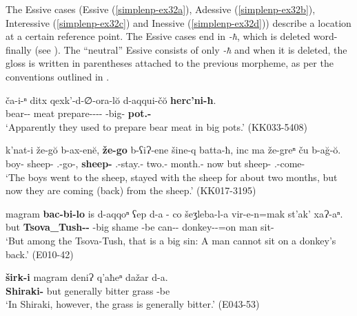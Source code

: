 The Essive cases (Essive (\ref{simplenp-ex32a}), Adessive (\ref{simplenp-ex32b}), Interessive (\ref{simplenp-ex32c}) and Inessive (\ref{simplenp-ex32d})) describe a location at a certain reference point. The Essive cases end in \textit{-ħ}, which is deleted word-finally (see ). The ``neutral'' Essive consists of only  \textit{-ħ} and when it is deleted, the gloss {\Ess} is written in parentheses attached to the previous morpheme, as per the conventions outlined in .

\begin{exe}
	\ex\label{simplenp-ex32}
	\begin{xlist}

			\ex\label{simplenp-ex32a}
			\gll ča-i-ⁿ ditx qexk'-d-∅-ora-l\u{o} d-aqqui-č\u{o} \textbf{herc'ni-ħ}.\\
			bear-{\Obl}-{\Gen} meat prepare-{\D}-{\Tr}-{\Imprf}-{\Sbjv} {\D}-big-{\Obl} \textbf{pot.{\Obl}-{\Ess}}\\
			\trans `Apparently they used to prepare bear meat in big pots.'
			\hfill (KK033-5408)
		
		
		
			\ex\label{simplenp-ex32b}
			\gll k'nat-i že-g\u{o} b-ax-en\u{e}, \textbf{že-go} b-ʕiɁ-ene šine-q batta-ħ, inc ma že-greⁿ ču b-a\u{g}-\u{o}.\\
			boy-{\Pl} sheep-{\All} {\M}.{\Pl}-go-{\Seq}, \textbf{sheep-{\Adess}} {\M}.{\Pl}-stay.{\Pfv}-{\Seq} two.{\Obl}-{\Approx} month.{\Obl}-{\Ess} now but sheep-{\Adabl} {\Pv} {\M}.{\Pl}-come-{\Npst}\\
			\trans `The boys went to the sheep, stayed with the sheep for about two months, but now they are coming (back) from the sheep.'
			\hfill (KK017-3195)
		
		
		
			\ex\label{simplenp-ex32c}
			\gll magram \textbf{bac-bi-lo} is d-aqqoⁿ ʕep d-a - co šeʒleba-l-a vir-e-n=mak st'ak' xaɁ-aⁿ.\\
			but \textbf{Tsova\_Tush-{\Pl}-{\Interess}} {\Med} {\D}-big shame {\D}-be {} {\Neg} can-{\Intr}-{\Npst} donkey-{\Obl}-{\Dat}=on man sit-{\Inf}\\
			\trans `But among the Tsova-Tush, that is a big sin: A man cannot sit on a donkey's back.'
			\hfill (E010-42)
		
		
		
			\ex\label{simplenp-ex32d}
			\gll \textbf{širk-i} magram deniɁ q'aħeⁿ dažar d-a.\\
			\textbf{Shiraki-{\Iness}} but generally bitter grass {\D}-be\\
			\trans `In Shiraki, however, the grass is generally bitter.'
			\hfill (E043-53)
		
		
	\end{xlist}
\end{exe}

